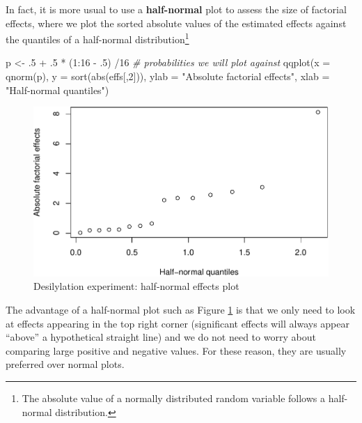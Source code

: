 \documentclass[
]{book}
\newenvironment{Shaded}{\begin{snugshade}}{\end{snugshade}}
\newcommand{\AttributeTok}[1]{\textcolor[rgb]{0.77,0.63,0.00}{#1}}
\newcommand{\CommentTok}[1]{\textcolor[rgb]{0.56,0.35,0.01}{\textit{#1}}}
\newcommand{\DecValTok}[1]{\textcolor[rgb]{0.00,0.00,0.81}{#1}}
\newcommand{\FunctionTok}[1]{\textcolor[rgb]{0.00,0.00,0.00}{#1}}
\newcommand{\NormalTok}[1]{#1}
\newcommand{\OtherTok}[1]{\textcolor[rgb]{0.56,0.35,0.01}{#1}}
\newcommand{\SpecialCharTok}[1]{\textcolor[rgb]{0.00,0.00,0.00}{#1}}
\newcommand{\StringTok}[1]{\textcolor[rgb]{0.31,0.60,0.02}{#1}}
\theoremstyle{definition}
\theoremstyle{definition}
\theoremstyle{definition}
\theoremstyle{definition}
\theoremstyle{remark}
\begin{document}
In fact, it is more usual to use a \textbf{half-normal} plot to assess the size of factorial effects, where we plot the sorted absolute values of the estimated effects against the quantiles of a half-normal distribution\footnote{The absolute value of a normally distributed random variable follows a half-normal distribution.}

\begin{Shaded}
\begin{Highlighting}[]
\NormalTok{p }\OtherTok{\textless{}{-}}\NormalTok{ .}\DecValTok{5} \SpecialCharTok{+}\NormalTok{ .}\DecValTok{5} \SpecialCharTok{*}\NormalTok{ (}\DecValTok{1}\SpecialCharTok{:}\DecValTok{16} \SpecialCharTok{{-}}\NormalTok{ .}\DecValTok{5}\NormalTok{) }\SpecialCharTok{/}\DecValTok{16} \CommentTok{\# probabilities we will plot against}
\FunctionTok{qqplot}\NormalTok{(}\AttributeTok{x =} \FunctionTok{qnorm}\NormalTok{(p), }\AttributeTok{y =} \FunctionTok{sort}\NormalTok{(}\FunctionTok{abs}\NormalTok{(effs[,}\DecValTok{2}\NormalTok{])), }\AttributeTok{ylab =} \StringTok{"Absolute factorial effects"}\NormalTok{, }
       \AttributeTok{xlab =} \StringTok{"Half{-}normal quantiles"}\NormalTok{)}
\end{Highlighting}
\end{Shaded}

\begin{figure}

{\centering \includegraphics{bookdown_math3014-6027_files/figure-latex/desilylation-half-normal-plot-1} 

}

\caption{Desilylation experiment: half-normal effects plot}\label{fig:desilylation-half-normal-plot}
\end{figure}

The advantage of a half-normal plot such as Figure \ref{fig:desilylation-half-normal-plot} is that we only need to look at effects appearing in the top right corner (significant effects will always appear ``above'' a hypothetical straight line) and we do not need to worry about comparing large positive and negative values. For these reason, they are usually preferred over normal plots.
\end{document}
